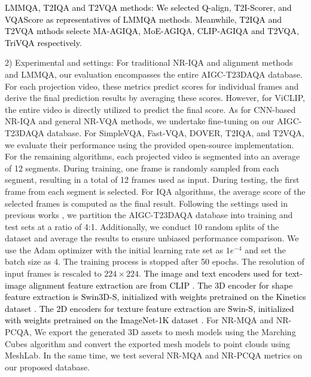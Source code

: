 \begin{itemize}
    \textcolor{black}{\item LMMQA, T2IQA and T2VQA methods: We selected Q-align\cite{wu2023q}, T2I-Scorer\cite{wu2024t2i}, and VQAScore\cite{wu2024t2i} as representatives of LMMQA methods. Meanwhile, T2IQA and T2VQA mthods selecte MA-AGIQA\cite{wang2024large}, MoE-AGIQA\cite{yang2024moe}, CLIP-AGIQA\cite{tang2025clip} and T2VQA\cite{kou2024subjective}, TriVQA\cite{qu2024exploring} respectively.   }
    
\end{itemize}


2) Experimental and settings: 
For traditional NR-IQA and alignment methods and LMMQA, our evaluation encompasses the entire AIGC-T23DAQA database. For each projection video, these metrics predict scores for individual frames and derive the final prediction results by averaging these scores. However, for ViCLIP, the entire video is directly utilized to predict the final score.
As for CNN-based NR-IQA and general NR-VQA methods, we undertake fine-tuning on our AIGC-T23DAQA database. For SimpleVQA, Fast-VQA, DOVER, T2IQA, and T2VQA, we evaluate their performance using the provided open-source implementation. For the remaining algorithms, each projected video is segmented into an average of 12 segments. During training, one frame is randomly sampled from each segment, resulting in a total of 12 frames used as input. During testing, the first frame from each segment is selected. For IQA algorithms, the average score of the selected frames is computed as the final result.
Following the settings used in previous works \cite{wu2022fastquality, wu2023dover}, we partition the AIGC-T23DAQA database into training and test sets at a ratio of 4:1. Additionally, we conduct 10 random splits of the dataset and average the results to ensure unbiased performance comparison. We use the Adam optimizer with the initial learning rate set as $1e^{-4}$ and set the batch size as 4. The training process is stopped after 50 epochs. The resolution of input frames is rescaled to $224 \times 224$. 
\textcolor{black}{The image and text encoders used for text-image alignment feature extraction are from CLIP \cite{radford2021learning}. The 3D encoder for shape feature extraction is Swin3D-S\cite{liu2022video}, initialized with weights pretrained on the Kinetics dataset \cite{kay2017kinetics}. The 2D encoders for texture feature extraction are Swin-S\cite{liu2021swin}, initialized with weights pretrained on the ImageNet-1K dataset \cite{deng2009imagenet}.}
For NR-MQA and NR-PCQA, We export the generated 3D assets to mesh models using the Marching Cubes algorithm and convert the exported mesh models to point clouds using MeshLab. In the same time, we test several NR-MQA and NR-PCQA metrics on our proposed database.


